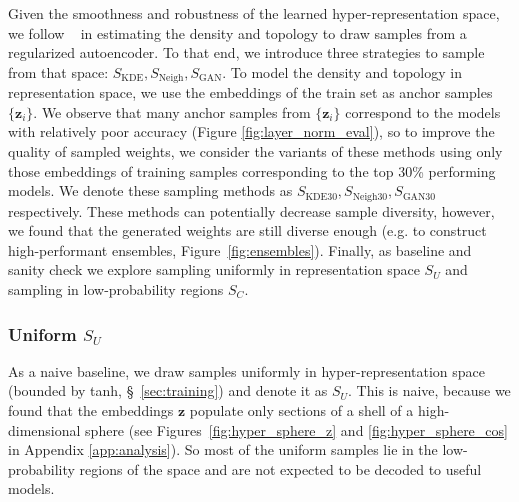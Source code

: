 \documentclass{article}
\begin{document}
%
Given the smoothness and robustness of the learned hyper-representation space, we follow ~\citep{liu2019acceleration,guo2019auto,ghoshVariationalDeterministicAutoencoders2020} in estimating the density and topology to draw samples from a regularized autoencoder. To that end, we introduce three strategies to sample from that space: $S_{\text{KDE}}, S_{\text{Neigh}}, S_{\text{GAN}}$.
To model the density and topology in representation space, we use the embeddings of the train set as anchor samples $\{\mathbf{z}_i\}$. 
We observe that many anchor samples from $\{\mathbf{z}_i\}$ correspond to the models with relatively poor accuracy (Figure \ref{fig:layer_norm_eval}), so to improve the quality of sampled weights, we consider the variants of these methods using only those embeddings of training samples corresponding to the top 30\% performing models. We denote these sampling methods as $S_{\text{KDE30}}, S_{\text{Neigh30}}, S_{\text{GAN30}}$ respectively.
These methods can potentially decrease sample diversity, however, we found that the generated weights are still diverse enough (e.g. to construct high-performant ensembles, Figure~\ref{fig:ensembles}).
Finally, as baseline and sanity check we explore sampling uniformly in representation space $S_U$ and sampling in low-probability regions $S_C$.

\vspace{-3pt}
\subsubsection{Uniform $S_U$}
\vspace{-3pt}
%
%
As a naive baseline, we draw samples uniformly in hyper-representation space (bounded by tanh, \S~\ref{sec:training}) and denote it as $S_U$. This is naive, because we found that the embeddings $\mathbf{z}$ populate only sections of a shell of a high-dimensional sphere (see Figures~\ref{fig:hyper_sphere_z} and \ref{fig:hyper_sphere_cos} in Appendix \ref{app:analysis}). So most of the uniform samples lie in the low-probability regions of the space and are not expected to be decoded to useful models.

%
\vspace{-3pt}
\end{document}
